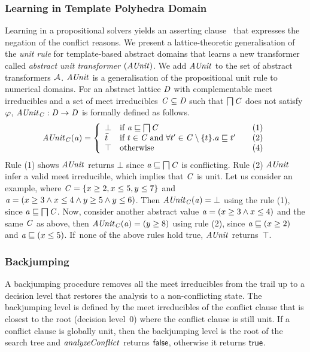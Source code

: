 \subsubsection{Learning in Template Polyhedra Domain}
%
Learning in a propositional solvers yields an asserting
clause~\cite{cdcl} that expresses the negation of the conflict
reasons.  We present a lattice-theoretic generalisation of the 
{\em unit rule} for template-based abstract domains that learns a new 
transformer called {\em abstract unit transformer} $(\mathit{AUnit})$.    
We add $\mathit{AUnit}$ to the set of abstract transformers $\mathcal{A}$. 
$\mathit{AUnit}$ is a generalisation of the propositional unit rule to
numerical domains.  For an abstract lattice $\mathit{D}$ with
complementable meet irreducibles and a set of meet irreducibles $\mathit{C}
\subseteq \mathit{D}$ such that $\bigsqcap
\mathit{C}$ does not satisfy $\varphi$, $\mathit{AUnit}_{\mathit{C}}: \mathit{D} \rightarrow
\mathit{D}$ is formally defined as follows.
\[ \aunit_\conflictset(\absval) =
 \left\{\begin{array}{l@{\quad}l@{\qquad}l}
  \bot       & \text{if } \absval \sqsubseteq \bigsqcap \conflictset & (1)\\
  \bar{t}    & \text{if } t \in \conflictset \; \text{and} \; \forall t' \in \conflictset
  \setminus \{t\}. \absval  \sqsubseteq t' & (2) \\
  \top & \text{otherwise} & (4) \\
 \end{array}\right.
\]
Rule (1) shows $\mathit{AUnit}$ returns $\bot$ since 
$\mathit{a} \sqsubseteq \bigsqcap \mathit{C}$ is conflicting.  
Rule (2) $\mathit{AUnit}$ infer a valid meet irreducible, 
which implies that $\mathit{C}$ is unit.
%
Let us consider an example, where $\mathit{C} = \{x \geq 2, x \leq 5, y
\leq 7 \}$ and $\mathit{a} = (x \geq 3\wedge\allowbreak x \leq
4\wedge\allowbreak y \geq 5\wedge y \leq 6)$.  Then
$\mathit{AUnit}_{\mathit{C}}(\mathit{a}) = \bot$ using the rule (1), since $\mathit{a}
\sqsubseteq \bigsqcap\mathit{C}$.  Now, consider another abstract value
$\mathit{a} = (x \geq 3\wedge x \leq 4)$ and the same $\mathit{C}$ as above,
then $\mathit{AUnit}_{\mathit{C}}(\mathit{a}) = (y \geq 8)$ using rule (2), since
$\mathit{a} \sqsubseteq (x \geq 2)$ and $\mathit{a} \sqsubseteq (x \leq 5)$.  
If~none of the above rules hold true, $\mathit{AUnit}$ returns~$\top$.
%
\subsubsection{Backjumping}
A backjumping procedure removes all the meet irreducibles from 
the trail up to a decision level that restores the analysis to a
non-conflicting state.  The backjumping level is defined by the
meet irreducibles of the conflict clause that is closest 
to the root (decision level~0) where the conflict
clause is still unit.  If a conflict clause is globally unit, then the
backjumping level is the root of the search tree and
$\mathit{analyzeConflict}$ returns $\mathsf{false}$, otherwise it returns $\mathsf{true}$.
